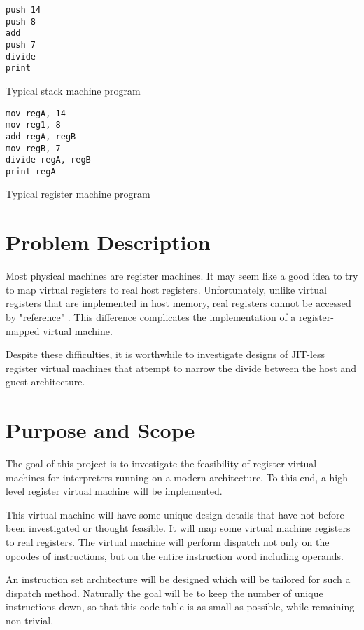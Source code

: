 			\begin{doublefig}
				\begin{halffig}
					\begin{lstlisting}
push 14
push 8
add
push 7
divide
print
					\end{lstlisting}
					\caption{Typical stack machine program}
					\label{fig:stackprogram}
				\end{halffig}
				\begin{halffig}
					\begin{lstlisting}
mov regA, 14
mov reg1, 8
add regA, regB
mov regB, 7
divide regA, regB
print regA
					\end{lstlisting}
					\caption{Typical register machine program}
					\label{fig:registerprogram}
				\end{halffig}
			\end{doublefig}
		
	\section{Problem Description}
		Most physical machines are register machines. It may seem like a good idea to try to map virtual registers to real host registers. Unfortunately, unlike virtual registers that are implemented in host memory, real registers cannot be accessed by "reference" \citep{caseregistervm}. This difference complicates the implementation of a register-mapped virtual machine. 
		
		Despite these difficulties, it is worthwhile to investigate designs of JIT-less register virtual machines that attempt to narrow the divide between the host and guest architecture.
	
	\section{Purpose and Scope}
		The goal of this project is to investigate the feasibility of register virtual machines for interpreters running on a modern architecture. To this end, a high-level register virtual machine will be implemented.
	
		This virtual machine will have some unique design details that have not before been investigated or thought feasible. It will map some virtual machine registers to real registers. The virtual machine will perform dispatch not only on the opcodes of instructions, but on the entire instruction word including operands. 
	
		An instruction set architecture will be designed which will be tailored for such a dispatch method. Naturally the goal will be to keep the number of unique instructions down, so that this code table is as small as possible, while remaining non-trivial.
		
